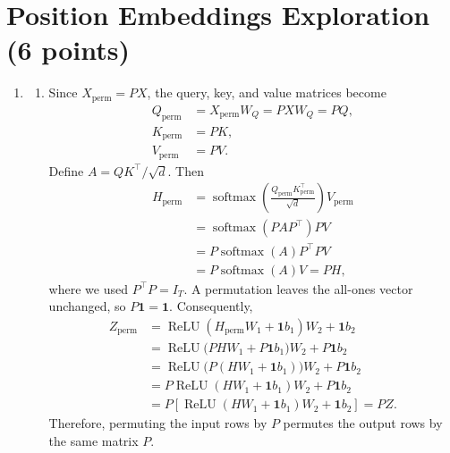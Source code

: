 \documentclass[11pt, a4paper, oneside]{article}
\begin{document}
\section{Position Embeddings Exploration (6 points)}
\begin{enumerate}[label=(\alph*), left=0pt, labelsep=1em, itemsep=1em]
    \item
    \begin{enumerate}[label=\roman*., left=0pt, labelsep=1em, itemsep=1em]
        \item Since
        $X_{\mathrm{perm}}=PX$, the query, key, and value matrices become
        \begin{align*}
            Q_{\mathrm{perm}}
            &=X_{\mathrm{perm}}W_Q=PXW_Q=PQ,\\
            K_{\mathrm{perm}}&=PK,\\
            V_{\mathrm{perm}}&=PV.
        \end{align*}
        Define $A=QK^\top/\sqrt d$. Then
        \begin{align*}
            H_{\mathrm{perm}}
            &=\operatorname{softmax}\!\left(
                \frac{Q_{\mathrm{perm}}K_{\mathrm{perm}}^\top}{\sqrt d}
              \right)V_{\mathrm{perm}}\\
            &=\operatorname{softmax}(PAP^\top)PV\\
            &=P\operatorname{softmax}(A)P^\top PV\\
            &=P\operatorname{softmax}(A)V
             =PH,
        \end{align*}
        where we used $P^\top P=I_T$. A permutation leaves the all-ones
        vector unchanged, so $P\mathbf1=\mathbf1$. Consequently,
        \begin{align*}
            Z_{\mathrm{perm}}
            &=\operatorname{ReLU}
              (H_{\mathrm{perm}}W_1+\mathbf1b_1)W_2+\mathbf1b_2\\
            &=\operatorname{ReLU}
              \bigl(PHW_1+P\mathbf1b_1\bigr)W_2+P\mathbf1b_2\\
            &=\operatorname{ReLU}
              \bigl(P(HW_1+\mathbf1b_1)\bigr)W_2+P\mathbf1b_2\\
            &=P\operatorname{ReLU}
              (HW_1+\mathbf1b_1)W_2+P\mathbf1b_2\\
            &=P\left[
                \operatorname{ReLU}(HW_1+\mathbf1b_1)W_2+\mathbf1b_2
              \right]
             =PZ.
        \end{align*}
        Therefore, permuting the input rows by $P$ permutes the output rows by
        the same matrix $P$.


\end{enumerate}
\end{enumerate}
\end{document}
